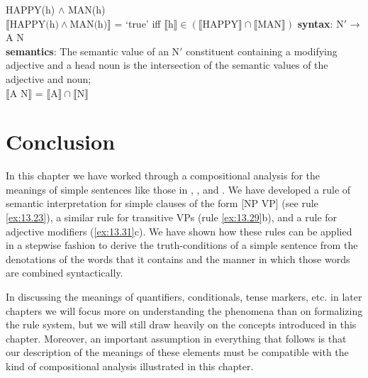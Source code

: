 \ea \label{ex:13.31}
\ea  HAPPY(h) $\wedge$ MAN(h)\\
\ex  $\llbracket\text{HAPPY(h)} \wedge \text{MAN(h)}\rrbracket$  = ‘true’  iff  $\llbracket\text{h}\rrbracket {\in} (\llbracket\text{HAPPY}\rrbracket {\cap} \llbracket\text{MAN}\rrbracket)$
\ex  \textbf{syntax}: N$'$ →  A N\\
\textbf{semantics}: The semantic value of an N$'$ constituent containing a modifying adjective and a head noun is the intersection of the semantic values of the adjective and noun;\\
{}$\llbracket\text{A N}\rrbracket$  =  $\llbracket\text{A}\rrbracket {\cap} \llbracket\text{N}\rrbracket$ 
\z \z

\section{Conclusion}\label{sec:13.6}

In this chapter we have worked through a compositional analysis for the meanings of simple sentences like those in , , and . We have developed a rule of semantic interpretation for simple clauses of the form [NP VP] (see rule \ref{ex:13.23}), a similar rule for transitive VPs (rule \ref{ex:13.29}b), and a rule for adjective modifiers (\ref{ex:13.31}c). We have shown how these rules can be applied in a stepwise fashion to derive the truth-conditions of a simple sentence from the denotations of the words that it contains and the manner in which those words are combined syntactically.



In discussing the meanings of quantifiers, conditionals, tense markers, etc. in later chapters we will focus more on understanding the phenomena than on formalizing the rule system, but we will still draw heavily on the concepts introduced in this chapter. Moreover, an important assumption in everything that follows is that our description of the meanings of these elements must be compatible with the kind of compositional analysis illustrated in this chapter.




